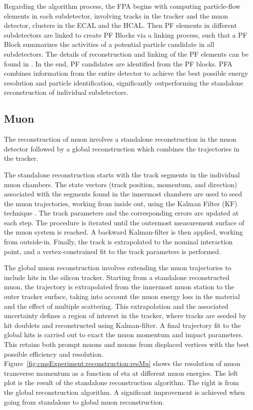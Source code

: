 Regarding the algorithm process, the FPA begins with computing particle-flow elements in each subdetector, involving tracks in the tracker and the muon detector, clusters in the ECAL and the HCAL. Then PF elements in different subdetectors are linked to create PF Blocks via a linking process, such that a PF Block summarizes the activities of a potential particle candidate in all subdetectors. The details of reconstruction and linking of the PF elements can be found in \cite{cms:particleflow:Sirunyan:2017ulk}. In the end, PF candidates are identified from the PF blocks. PFA combines information from the entire detector to achieve the best possible energy resolution and particle identification, significantly outperforming the standalone reconstruction of individual subdetectors.




\subsection{Muon}
\label{sec:cmsExperiment:reconstruction:muon}

The reconstruction of muon involves a standalone reconstruction in the muon detector followed by a global reconstruction which combines the trajectories in the tracker. 

The standalone reconstruction starts with the track segments in the individual muon chambers. The state vectors (track position, momentum, and direction) associated with the segments found in the innermost chambers are used to seed the muon trajectories, working from inside out, using the Kalman Filter (KF) technique \cite{tech:kf:Fruhwirth:1987fm}. The track parameters and the corresponding errors are updated at each step. The procedure is iterated until the outermost measurement surface of the muon system is reached. A backward Kalman-filter is then applied, working from outside-in. Finally, the track is extrapolated to the nominal interaction point, and a vertex-constrained fit to the track parameters is performed.

The global muon reconstruction involves extending the muon trajectories to include hits in the silicon tracker. Starting from a standalone reconstructed muon, the trajectory is extrapolated from the innermost muon station to the outer tracker surface, taking into account the muon energy loss in the material and the effect of multiple scattering. This extrapolation and the associated uncertainty defines a region of interest in the tracker, where tracks are seeded by hit doublets and reconstructed using Kalman-filter. A final trajectory fit to the global hits is carried out to exact the muon momentum and impact parameters. This retains both prompt muons and muons from displaced vertices with the best possible efficiency and resolution. Figure~\ref{fig:cmsExperiment:reconstruction:resMu} shows the resolution of muon transverse momentum as a function of eta at different muon energies. The left plot is the result of the standalone reconstruction algorithm. The right is from the global reconstruction algorithm. A significant improvement is achieved when going from standalone to global muon reconstruction.


